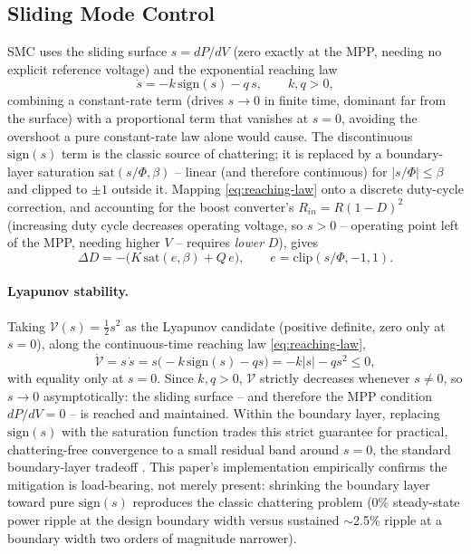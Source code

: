 \subsection{Sliding Mode Control}
SMC uses the sliding surface $s=dP/dV$ (zero exactly at the MPP, needing no
explicit reference voltage) and the exponential reaching law
\cite{gao1993variable}
\begin{equation}
\dot{s} = -k\,\mathrm{sign}(s) - q\,s, \qquad k, q > 0,
\label{eq:reaching-law}
\end{equation}
combining a constant-rate term (drives $s\to0$ in finite time, dominant far
from the surface) with a proportional term that vanishes at $s=0$,
avoiding the overshoot a pure constant-rate law alone would cause. The
discontinuous $\mathrm{sign}(s)$ term is the classic source of chattering;
it is replaced by a boundary-layer saturation
$\mathrm{sat}(s/\Phi, \beta)$ \cite{slotine1991applied} -- linear (and
therefore continuous) for $|s/\Phi|\le\beta$ and clipped to $\pm1$ outside
it. Mapping \eqref{eq:reaching-law} onto a discrete duty-cycle correction,
and accounting for the boost converter's $R_{in}=R(1-D)^2$ (increasing
duty cycle decreases operating voltage, so $s>0$ -- operating point left
of the MPP, needing higher $V$ -- requires \emph{lower} $D$), gives
\begin{equation}
\Delta D = -\bigl(K\,\mathrm{sat}(e,\beta) + Q\,e\bigr), \qquad
e = \mathrm{clip}(s/\Phi, -1, 1).
\label{eq:smc-control-law}
\end{equation}

\paragraph{Lyapunov stability.} Taking $\mathcal{V}(s)=\tfrac{1}{2}s^2$ as
the Lyapunov candidate (positive definite, zero only at $s=0$), along the
continuous-time reaching law \eqref{eq:reaching-law},
\begin{equation}
\dot{\mathcal{V}} = s\,\dot{s} = s\bigl(-k\,\mathrm{sign}(s) - qs\bigr)
  = -k|s| - qs^2 \le 0,
\label{eq:lyapunov}
\end{equation}
with equality only at $s=0$. Since $k,q>0$, $\mathcal{V}$ strictly
decreases whenever $s\neq0$, so $s\to0$ asymptotically: the sliding
surface -- and therefore the MPP condition $dP/dV=0$ -- is reached and
maintained. Within the boundary layer, replacing $\mathrm{sign}(s)$ with
the saturation function trades this strict guarantee for practical,
chattering-free convergence to a small residual band around $s=0$, the
standard boundary-layer tradeoff \cite{slotine1991applied}. This paper's
implementation empirically confirms the mitigation is load-bearing, not
merely present: shrinking the boundary layer toward pure
$\mathrm{sign}(s)$ reproduces the classic chattering problem (0\% steady-state
power ripple at the design boundary width versus sustained
$\sim$2.5\% ripple at a boundary width two orders of magnitude narrower).

